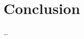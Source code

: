 \documentclass[12pt]{article}
\begin{document}
\section{Conclusion}
\ldots

\newpage
\begin{footnotesize} %
\singlespacing %
\setlength{\bibsep}{5pt} %
\thispagestyle{empty} %
\end{footnotesize} %
\end{document}
